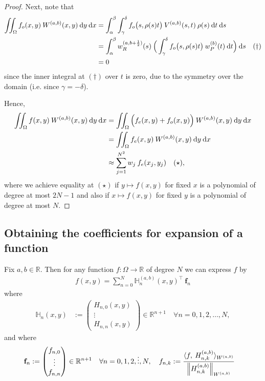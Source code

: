 \documentclass[11pt, oneside]{article}   	%
\newcommand{\half}{\frac{1}{2}}
\newcommand{\R}{\mathbb{R}}
\newcommand{\hdop}{H}
\newcommand{\bighdop}{\mathbb{\hdop}}
\newcommand{\hdopnk}{\hdop_{n,k}}
\newcommand{\Wab}{{W^{(a,b)}}}
\newcommand{\genjac}{R}
\newcommand{\genjacw}{w_\genjac}
\newcommand{\jacw}{w_P}
\begin{document}
\begin{proof}
Next, note that 
\begin{align*}
	\iint_\Omega f_o(x,y) \: \Wab(x,y) \: \D y \: \D x &= \int_\alpha^\beta \int_\gamma^\delta f_o\big(s,\rho(s) t\big) \: V^{(a,b)}(s,t) \: \rho(s) \: \D t \: \D s \\
	&= \int_\alpha^\beta  \genjacw^{(a,b+\half)}(s) \: \Big( \int_\gamma^\delta f_o\big(s,\rho(s) t\big) \: \jacw^{(b)}(t) \: \D t \Big) \: \D s \quad (\dagger) \\
	&= 0
\end{align*}
since the inner integral at $(\dagger)$ over $t$ is zero, due to the symmetry over the domain (i.e. since $\gamma = -\delta$).

Hence,
\begin{align*}
	\iint_\Omega f(x,y) \: \Wab(x,y) \: \D y \: \D x &= \iint_\Omega \Big(f_e(x,y) + f_o(x,y)\Big) \: \Wab(x,y) \: \D y \: \D x \\
	&= \iint_\Omega f_e(x,y) \: \Wab(x,y) \: \D y \: \D x \\
	&\approx \sum_{j=1}^{N^2}  w_j \: f_e(x_j, y_j) \quad (\star),
\end{align*}
where we achieve equality at $(\star)$ if $y \mapsto f(x,y)$ for fixed $x$ is a polynomial of degree at most $2N-1$ and also if $x \mapsto f(x,y)$ for fixed $y$ is a polynomial of degree at most $N$.
\end{proof}


\subsection{Obtaining the coefficients for expansion of a function}

Fix \(a,b \in \R\). Then for any function \(f : \Omega \to \R\) of degree $N$ we can express \(f\) by
\begin{align*}
f(x,y) = \sum_{n=0}^N \bighdop_n^{(a,b)}(x,y)^\top \: \mathbf{f}_n
\end{align*}
where
\begin{align*}
\bighdop_n(x,y) &:= \begin{pmatrix}
		\hdop_{n,0}(x,y) \\
		\vdots \\
		\hdop_{n,n}(x,y)
	\end{pmatrix} \in \R^{n+1} \quad \forall n = 0,1,2,\dots,N,
\end{align*}
and where
\begin{align*}
\mathbf{f}_n &:= \begin{pmatrix}
		f_{n,0} \\
		\vdots \\
		f_{n,n}
	\end{pmatrix} \in \R^{n+1} \quad \forall n = 0,1,2,\dots,N, \quad
f_{n,k} := \frac{\langle f, \: \hdopnk^{(a,b)} \rangle_{W^{(a,b)}}}{\norm{\hdopnk^{(a,b)}}_{W^{(a,b)}}}
\end{align*}
\end{document}
